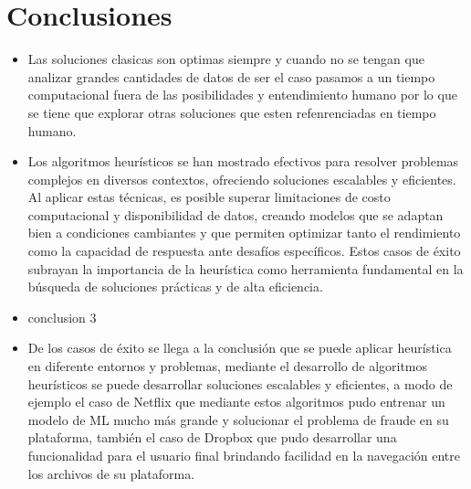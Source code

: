 \documentclass[9pt,a4paper,twoside]{rho-class/rho}
\begin{document}
    \section{Conclusiones}
        \begin{itemize}
            \item Las soluciones clasicas son optimas siempre y cuando no se tengan que analizar grandes cantidades de datos de ser el caso pasamos a un tiempo computacional fuera de las posibilidades y entendimiento humano por lo que se tiene que explorar otras soluciones que esten refenrenciadas en tiempo humano.
            \item Los algoritmos heurísticos se han mostrado efectivos para resolver problemas complejos en diversos contextos, ofreciendo soluciones escalables y eficientes. Al aplicar estas técnicas, es posible superar limitaciones de costo computacional y disponibilidad de datos, creando modelos que se adaptan bien a condiciones cambiantes y que permiten optimizar tanto el rendimiento como la capacidad de respuesta ante desafíos específicos. Estos casos de éxito subrayan la importancia de la heurística como herramienta fundamental en la búsqueda de soluciones prácticas y de alta eficiencia.
            \item conclusion 3
            \item De los casos de éxito se llega a la conclusión que se puede aplicar heurística en diferente entornos y problemas, mediante el desarrollo de algoritmos heurísticos se puede desarrollar soluciones escalables y eficientes, a modo de ejemplo el caso de Netflix que mediante estos algoritmos pudo entrenar un modelo de ML mucho más grande y solucionar el problema de fraude en su plataforma, también el caso de Dropbox que pudo desarrollar una funcionalidad para el usuario final brindando facilidad en la navegación entre los archivos de su plataforma.
        \end{itemize}
    \renewcommand{\contentsname}{Tabla de Contenidos}
    \tableofcontents
    \linenumbers

\printbibliography

\end{document}
